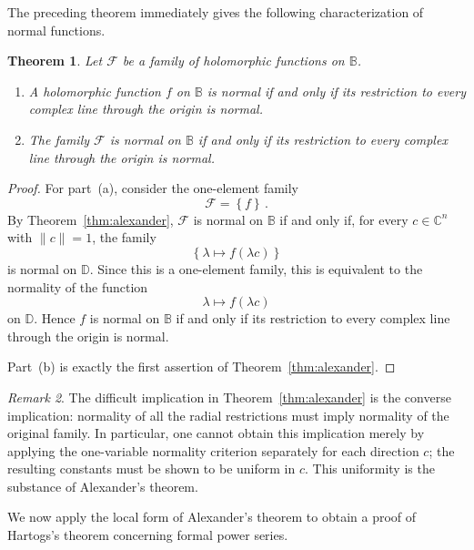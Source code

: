 \documentclass[pdflatex]{sn-jnl}%
\newtheorem{thm}{Theorem}[section]
\theoremstyle{definition}
\theoremstyle{remark}
\newtheorem{rem}[thm]{Remark}
\numberwithin{equation}{section}
\newcommand{\set}[1]{\left\{#1\right\}}
\newcommand{\C}{\mathbb{C}}
\newcommand{\D}{\mathbb{D}}
\begin{document}
    The preceding theorem immediately gives the following characterization of normal functions.

    \begin{thm}
        \label{thm:alexander-plus}
        Let $\mathcal{F}$ be a family of holomorphic functions on $\mathbb{B}$.
        \begin{enumerate}
            \item[(a)] A holomorphic function $f$ on $\mathbb{B}$ is normal if and only if its restriction to every complex line through the origin is normal.

            \item[(b)] The family $\mathcal{F}$ is normal on $\mathbb{B}$ if and only if its restriction to every complex line through the origin is normal.
        \end{enumerate}
    \end{thm}

    \begin{proof}
        For part~(a), consider the one-element family
        \[
            \mathcal{F}=\set{f}\,.
        \]
        By Theorem~\ref{thm:alexander}, $\mathcal{F}$ is normal on $\mathbb{B}$ if and only if, for every $c\in\C^n$ with $\lVert c\rVert=1$, the family
        \[
            \set{\lambda\mapsto f(\lambda c)}
        \]
        is normal on $\D$.
        Since this is a one-element family, this is equivalent to the normality of the function
        \[
            \lambda\mapsto f(\lambda c)
        \]
        on $\D$.
        Hence $f$ is normal on $\mathbb{B}$ if and only if its restriction to every complex line through the origin is normal.

        Part~(b) is exactly the first assertion of Theorem~\ref{thm:alexander}.
    \end{proof}

    \begin{rem}
        \label{rem:alexander-proof}
        The difficult implication in Theorem~\ref{thm:alexander} is the converse implication: normality of all the radial restrictions must imply normality of the original family.
        In particular, one cannot obtain this implication merely by applying the one-variable normality criterion separately for each direction $c$; the resulting constants must be shown to be uniform in $c$.
        This uniformity is the substance of Alexander's theorem.
    \end{rem}

    We now apply the local form of Alexander's theorem to obtain a proof of Hartogs's theorem concerning formal power series.
\end{document}
